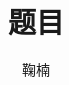 \documentclass[EnMaster]{BJTU-Thesis}
\author{鞠楠}
\title{题目}
\begin{document}
	\makeInfo
\end{document}
